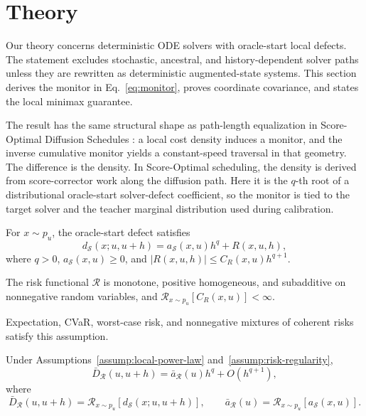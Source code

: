 \section{Theory}
\label{sec:theory}

Our theory concerns deterministic ODE solvers with oracle-start local
defects. The statement excludes stochastic, ancestral, and history-dependent
solver paths unless they are rewritten as deterministic augmented-state systems.
This section derives the monitor in Eq.~\eqref{eq:monitor}, proves coordinate
covariance, and states the local minimax guarantee.

The result has the same structural shape as path-length equalization in
Score-Optimal Diffusion Schedules \citep{williams2024scoreoptimal}: a local
cost density induces a monitor, and the inverse cumulative monitor yields a
constant-speed traversal in that geometry. The difference is the density. In
Score-Optimal scheduling, the density is derived from score-corrector work along
the diffusion path. Here it is the $q$-th root of a distributional
oracle-start solver-defect coefficient, so the monitor is tied to the target
solver and the teacher marginal distribution used during calibration.

\begin{assumption}
\label{assump:local-power-law}
For $x\sim p_u$, the oracle-start defect satisfies
\begin{equation}
  d_{\mathcal S}(x;u,u+h)
  =
  a_{\mathcal S}(x,u)h^q+R(x,u,h),
\end{equation}
where $q>0$, $a_{\mathcal S}(x,u)\ge0$, and
$|R(x,u,h)|\le C_R(x,u)h^{q+1}$.
\end{assumption}

\begin{assumption}
\label{assump:risk-regularity}
The risk functional $\mathcal R$ is monotone, positive homogeneous, and
subadditive on nonnegative random variables, and
$\mathcal R_{x\sim p_u}[C_R(x,u)]<\infty$.
\end{assumption}

Expectation, CVaR, worst-case risk, and nonnegative mixtures of coherent risks
satisfy this assumption.

\begin{theorem}
\label{thm:distributional-power-law}
Under Assumptions~\ref{assump:local-power-law}
and~\ref{assump:risk-regularity},
\begin{equation}
  \bar D_{\mathcal R}(u,u+h)
  =
  \bar a_{\mathcal R}(u)h^q+O(h^{q+1}),
\end{equation}
where
\begin{equation}
  \bar D_{\mathcal R}(u,u+h)
  =
  \mathcal R_{x\sim p_u}
  \!\left[d_{\mathcal S}(x;u,u+h)\right],
  \qquad
  \bar a_{\mathcal R}(u)
  =
  \mathcal R_{x\sim p_u}
  \!\left[a_{\mathcal S}(x,u)\right].
\end{equation}
\end{theorem}

